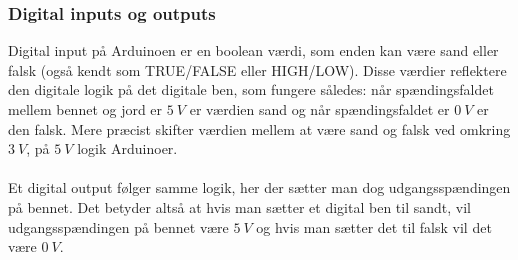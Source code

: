 \subsubsection{Digital inputs og outputs}
Digital input på Arduinoen er en boolean værdi, som enden kan være sand eller falsk (også kendt som TRUE/FALSE eller HIGH/LOW). Disse værdier reflektere den digitale logik på det digitale ben, som fungere således: når spændingsfaldet mellem bennet og jord er $\SI{5}{V}$ er værdien sand og når spændingsfaldet er $\SI{0}{V}$ er den falsk. Mere præcist skifter værdien mellem at være sand og falsk ved omkring $\SI{3}{V}$, på $\SI{5}{V}$ logik Arduinoer. \cite{arduino:dig}\\
\\
Et digital output følger samme logik, her der sætter man dog udgangsspændingen på bennet. Det betyder altså at hvis man sætter et digital ben til sandt, vil udgangsspændingen på bennet være $\SI{5}{V}$ og hvis man sætter det til falsk vil det være $\SI{0}{V}$. \cite{arduino:dig}\\
\\


